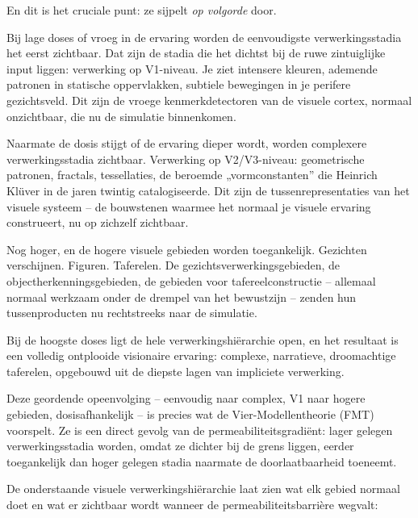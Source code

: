 \documentclass[11pt, twoside, openright]{book}
\begin{document}
En dit is het cruciale punt: ze sijpelt \textit{op volgorde} door.

Bij lage doses of vroeg in de ervaring worden de eenvoudigste verwerkingsstadia het eerst zichtbaar. Dat zijn de stadia die het dichtst bij de ruwe zintuiglijke input liggen: verwerking op V1-niveau. Je ziet intensere kleuren, ademende patronen in statische oppervlakken, subtiele bewegingen in je perifere gezichtsveld. Dit zijn de vroege kenmerkdetectoren van de visuele cortex, normaal onzichtbaar, die nu de simulatie binnenkomen.

Naarmate de dosis stijgt of de ervaring dieper wordt, worden complexere verwerkingsstadia zichtbaar. Verwerking op V2/\allowbreak{}V3-niveau: geometrische patronen, fractals, tessellaties, de beroemde „vormconstanten” die Heinrich Klüver in de jaren twintig catalogiseerde. Dit zijn de tussenrepresentaties van het visuele systeem -- de bouwstenen waarmee het normaal je visuele ervaring construeert, nu op zichzelf zichtbaar.

Nog hoger, en de hogere visuele gebieden worden toegankelijk. Gezichten verschijnen. Figuren. Taferelen. De gezichtsverwerkingsgebieden, de objectherkenningsgebieden, de gebieden voor tafereelconstructie -- allemaal normaal werkzaam onder de drempel van het bewustzijn -- zenden hun tussenproducten nu rechtstreeks naar de simulatie.

Bij de hoogste doses ligt de hele verwerkingshiërarchie open, en het resultaat is een volledig ontplooide visionaire ervaring: complexe, narratieve, droomachtige taferelen, opgebouwd uit de diepste lagen van impliciete verwerking.

Deze geordende opeenvolging -- eenvoudig naar complex, V1 naar hogere gebieden, dosisafhankelijk -- is precies wat de Vier-Modellentheorie (FMT) voorspelt. Ze is een direct gevolg van de permeabiliteitsgradiënt: lager gelegen verwerkingsstadia worden, omdat ze dichter bij de grens liggen, eerder toegankelijk dan hoger gelegen stadia naarmate de doorlaatbaarheid toeneemt.

De onderstaande visuele verwerkingshiërarchie laat zien wat elk gebied normaal doet en wat er zichtbaar wordt wanneer de permeabiliteitsbarrière wegvalt:
\end{document}

